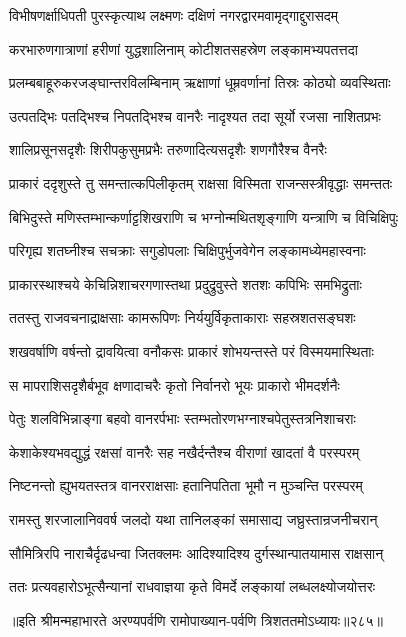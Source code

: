 \twolineshloka
{विभीषणर्क्षाधिपती पुरस्कृत्याथ लक्ष्मणः}
{दक्षिणं नगरद्वारमवामृद्गाद्दुरासदम्}


\twolineshloka
{करभारुणगात्राणां हरीणां युद्धशालिनाम्}
{कोटीशतसहस्रेण लङ्कामभ्यपतत्तदा}


\twolineshloka
{प्रलम्बबाहूरुकरजङ्घान्तरविलम्बिनाम्}
{ऋक्षाणां धूम्रवर्णानां तिस्रः कोठ्यो व्यवस्थिताः}


\twolineshloka
{उत्पतद्भिः पतद्भिश्च निपतद्भिश्च वानरैः}
{नादृश्यत तदा सूर्यो रजसा नाशितप्रभः}


\twolineshloka
{शालिप्रसूनसदृशैः शिरीपकुसुमप्रभैः}
{तरुणादित्यसदृशैः शणगौरैश्च वैनरैः}


\twolineshloka
{प्राकारं ददृशुस्ते तु समन्तात्कपिलीकृतम्}
{राक्षसा विस्मिता राजन्सस्त्रीवृद्धाः समन्ततः}


\twolineshloka
{बिभिदुस्ते मणिस्तम्भान्कर्णाट्टशिखराणि च}
{भग्नोन्मथितशृङ्गाणि यन्त्राणि च विचिक्षिपुः}


\twolineshloka
{परिगृह्य शतघ्नीश्च सचक्राः सगुडोपलाः}
{चिक्षिपुर्भुजवेगेन लङ्कामध्येमहास्वनाः}


\twolineshloka
{प्राकारस्थाश्चये केचिन्निशाचरगणास्तथा}
{प्रदुद्रुवुस्ते शतशः कपिभिः समभिद्रुताः}


\twolineshloka
{ततस्तु राजवचनाद्राक्षसाः कामरूपिणः}
{निर्ययुर्विकृताकाराः सहस्रशतसङ्घशः}


\twolineshloka
{शखवर्षाणि वर्षन्तो द्रावयित्वा वनौकसः}
{प्राकारं शोभयन्तस्ते परं विस्मयमास्थिताः}


\twolineshloka
{स मापराशिसदृशैर्बभूव क्षणादाचरैः}
{कृतो निर्वानरो भूयः प्राकारो भीमदर्शनैः}


\twolineshloka
{पेतुः शलविभिन्नाङ्गा बहवो वानरर्पभाः}
{स्तम्भतोरणभग्नाश्चपेतुस्तत्रनिशाचराः}


\twolineshloka
{केशाकेश्यभवद्युद्धं रक्षसां वानरैः सह}
{नखैर्दन्तैश्च वीराणां खादतां वै परस्परम्}


\twolineshloka
{निष्टनन्तो ह्युभयतस्तत्र वानरराक्षसाः}
{हतानिपतिता भूमौ न मुञ्चन्ति परस्परम्}


\twolineshloka
{रामस्तु शरजालानिववर्ष जलदो यथा}
{तानिलङ्कां समासाद्य जघ्रुस्तान्रजनीचरान्}


\twolineshloka
{सौमित्रिरपि नाराचैर्दृढधन्वा जितक्लमः}
{आदिश्यादिश्य दुर्गस्थान्पातयामास राक्षसान्}


\twolineshloka
{ततः प्रत्यवहारोऽभूत्सैन्यानां राधवाज्ञया}
{कृते विमर्दे लङ्कायां लब्धलक्ष्योजयोत्तरः}


॥इति श्रीमन्महाभारते अरण्यपर्वणि रामोपाख्यान-पर्वणि त्रिशततमोऽध्यायः॥२८५॥



